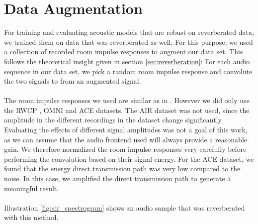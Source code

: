 \section{Data Augmentation}
For training and evaluating acoustic models that are robust on reverberated data, we trained them on data that was reverberated as well. For this purpose, we used a collection of recorded room impulse responses to augment our data set. This follows the theoretical insight given in section \ref{sec:reverberation}: For each audio sequence in our data set, we pick a random room impulse response and convolute the two signals to from an augmented signal. \\ \\
The room impulse responses we used are similar as in \cite{ritter2016training}. However we did only use the RWCP \cite{nakamura2000acoustical}, OMNI \cite{stewart2010database} and ACE \cite{eaton2015ace} datasets. The AIR dataset  \cite{jeub2009binaural} was not used, since the amplitude in the different recordings in the dataset change significantly.
Evaluating the effects of different signal amplitudes was not a goal of this work, as we can assume that the audio frontend used will always provide a reasonable gain. We therefore normalized the room impulse responses very carefully before performing the convolution based on their signal energy. For the ACE dataset, we found that the energy direct transmission path was very low compared to the noise. In this case, we amplified the direct transmission path to generate a meaningful result. \\ \\
Illustration \ref{fig:air_spectrogram} shows an audio sample that was reverberated with this method. 
